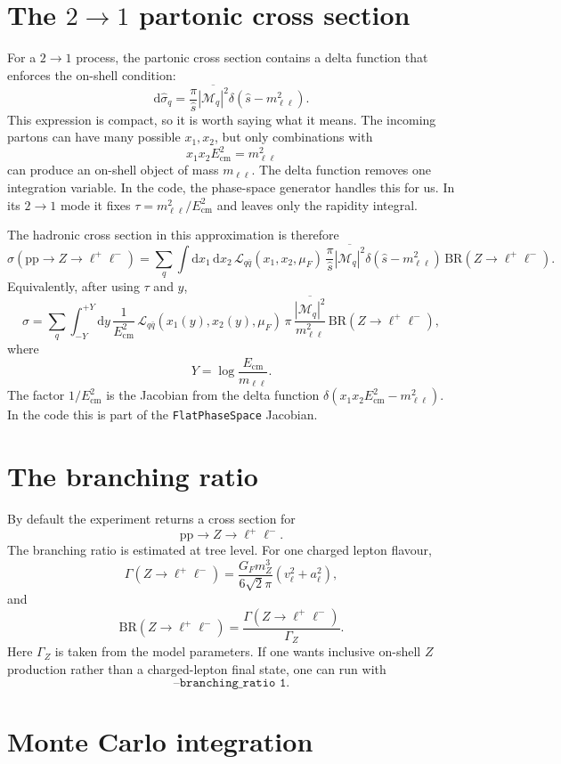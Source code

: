 \documentclass[11pt]{article}
\newcommand{\dd}{\mathrm{d}}
\newcommand{\pp}{\mathrm{p}}
\newcommand{\mll}{m_{\ell\ell}}
\newcommand{\shat}{\hat s}
\newcommand{\ecm}{E_{\mathrm{cm}}}
\newcommand{\mZ}{m_Z}
\begin{document}
\section{The \(2\to1\) partonic cross section}

For a \(2\to1\) process, the partonic cross section contains a delta function
that enforces the on-shell condition:
\[
  \dd \hat\sigma_q
  =
  \frac{\pi}{\shat}
  \overline{|\mathcal{M}_q|^2}
  \delta(\shat-\mll^2).
\]
This expression is compact, so it is worth saying what it means.
The incoming partons can have many possible \(x_1,x_2\), but only combinations
with
\[
  x_1 x_2 \ecm^2 = \mll^2
\]
can produce an on-shell object of mass \(\mll\).  The delta function removes
one integration variable.  In the code, the phase-space generator handles this
for us.  In its \(2\to1\) mode it fixes \(\tau=\mll^2/\ecm^2\) and leaves only
the rapidity integral.

The hadronic cross section in this approximation is therefore
\[
  \sigma(\pp\pp\to Z\to\ell^+\ell^-)
  =
  \sum_q
  \int \dd x_1\,\dd x_2\,
  \mathcal{L}_{q\bar q}(x_1,x_2,\mu_F)\,
  \frac{\pi}{\shat}
  \overline{|\mathcal{M}_q|^2}
  \delta(\shat-\mll^2)\,
  \mathrm{BR}(Z\to\ell^+\ell^-).
\]
Equivalently, after using \(\tau\) and \(y\),
\[
  \sigma
  =
  \sum_q
  \int_{-Y}^{+Y}\dd y\,
  \frac{1}{\ecm^2}\,
  \mathcal{L}_{q\bar q}(x_1(y),x_2(y),\mu_F)\,
  \pi\,
  \frac{\overline{|\mathcal{M}_q|^2}}{\mll^2}\,
  \mathrm{BR}(Z\to\ell^+\ell^-),
\]
where
\[
  Y = \log\frac{\ecm}{\mll}.
\]
The factor \(1/\ecm^2\) is the Jacobian from the delta function
\(\delta(x_1x_2\ecm^2-\mll^2)\).  In the code this is part of the
\texttt{FlatPhaseSpace} Jacobian.

\section{The branching ratio}

By default the experiment returns a cross section for
\[
  \pp\pp\to Z\to \ell^+\ell^- .
\]
The branching ratio is estimated at tree level.  For one charged lepton flavour,
\[
  \Gamma(Z\to\ell^+\ell^-)
  =
  \frac{G_F\mZ^3}{6\sqrt{2}\pi}
  \left(v_\ell^2+a_\ell^2\right),
\]
and
\[
  \mathrm{BR}(Z\to\ell^+\ell^-)
  =
  \frac{\Gamma(Z\to\ell^+\ell^-)}{\Gamma_Z}.
\]
Here \(\Gamma_Z\) is taken from the model parameters.  If one wants inclusive
on-shell \(Z\) production rather than a charged-lepton final state, one can run
with
\[
  \texttt{--branching\_ratio 1}.
\]

\section{Monte Carlo integration}
\end{document}
